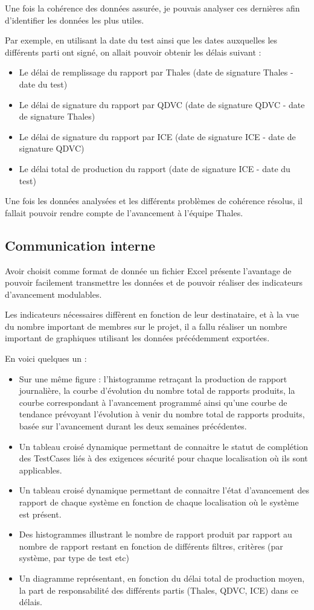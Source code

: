 Une fois la cohérence des données assurée, je pouvais analyser ces dernières afin d'identifier les données les plus utiles.

Par exemple, en utilisant la date du test ainsi que les dates auxquelles les différents parti ont signé, on allait pouvoir obtenir les délais suivant : 
\begin{itemize}
\item Le délai de remplissage du rapport par Thales (date de signature Thales - date du test)
\item Le délai de signature du rapport par QDVC (date de signature QDVC - date de signature Thales)
\item Le délai de signature du rapport par ICE (date de signature ICE - date de signature QDVC)
\item Le délai total de production du rapport (date de signature ICE - date du test)
\end{itemize}

Une fois les données analysées et les différents problèmes de cohérence résolus, il fallait pouvoir rendre compte de l'avancement à l'équipe Thales.

\subsection{Communication interne}
Avoir choisit comme format de donnée un fichier Excel présente l'avantage de pouvoir facilement transmettre les données et de pouvoir réaliser des indicateurs d'avancement modulables.

Les indicateurs nécessaires diffèrent en fonction de leur destinataire, et à la vue du nombre important de membres sur le projet, il a fallu réaliser un nombre important de graphiques utilisant les données précédemment exportées. 

En voici quelques un :

\begin{itemize}
\item Sur une même figure : l'histogramme retraçant la production de rapport journalière, la courbe d'évolution du nombre total de rapports produits, la courbe correspondant à l'avancement programmé ainsi qu'une courbe de tendance prévoyant l'évolution à venir du nombre total de rapports produits, basée sur l'avancement durant les deux semaines précédentes.
\item Un tableau croisé dynamique permettant de connaitre le statut de complétion des \gls{TestCases} liés à des exigences sécurité pour chaque localisation où ils sont applicables.
\item Un tableau croisé dynamique permettant de connaitre l'état d'avancement des rapport de chaque système en fonction de chaque localisation où le système est présent.
\item Des histogrammes illustrant le nombre de rapport produit par rapport au nombre de rapport restant en fonction de différents filtres, critères (par système, par type de test etc)
\item Un diagramme représentant, en fonction du délai total de production moyen, la part de responsabilité des différents partis (Thales, QDVC, ICE) dans ce délais.
\end{itemize}

